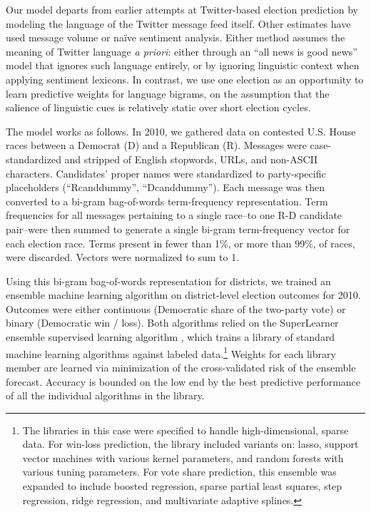\documentclass{sig-alternate-2013}
\begin{document}
Our model departs from earlier attempts at Twitter-based election
prediction by modeling the language of the Twitter message feed
itself. Other estimates have used message volume or na\"ive sentiment
analysis. Either method assumes the meaning of Twitter language
\textit{a priori}: either through an ``all news is good news'' model
that ignores such language entirely, or by ignoring linguistic context
when applying sentiment lexicons. In contrast, we use one election as
an opportunity to learn predictive weights for language bigrams, on
the assumption that the salience of linguistic cues is relatively
static over short election cycles.

The model works as follows. In 2010, we gathered data on contested
U.S. House races between a Democrat (D) and a Republican (R). Messages
were case-standardized and stripped of English stopwords, URLs, and
non-ASCII characters. Candidates' proper names were standardized to
party-specific placeholders (``Rcanddummy'', ``Dcanddummy''). Each
message was then converted to a bi-gram bag-of-words term-frequency
representation. Term frequencies for all messages pertaining to a
single race--to one R-D candidate pair--were then summed to generate a
single bi-gram term-frequency vector for each election race. Terms
present in fewer than 1\%, or more than 99\%, of races, were
discarded. Vectors were normalized to sum to 1.

Using this bi-gram bag-of-words representation for districts, we
trained an ensemble machine learning algorithm on district-level
election outcomes for 2010. Outcomes were either continuous
(Democratic share of the two-party vote) or binary (Democratic win /
loss). Both algorithms relied on the SuperLearner ensemble supervised
learning algorithm \cite{van2007super,polley2010}, which trains a
library of standard machine learning algorithms against labeled
data.\footnote{The libraries in this case were specified to handle
high-dimensional, sparse data. For win-loss prediction, the library
included variants on: lasso, support vector machines with various
kernel parameters, and random forests with various tuning
parameters. For vote share prediction, this ensemble was expanded to
include boosted regression, sparse partial least squares, step
regression, ridge regression, and multivariate adaptive splines.}
Weights for each library member are learned via minimization of the
cross-validated risk of the ensemble forecast. Accuracy is bounded on
the low end by the best predictive performance of all the individual
algorithms in the library.
\end{document}
